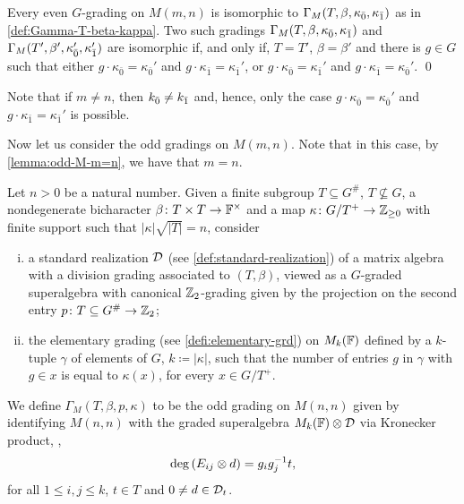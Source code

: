 \begin{cor}\label{cor:iso-M-even}
    Every even $G$-grading on $M(m,n)$ is isomorphic to $\Gamma_M (T, \beta, \kappa_{\bar{0}}, \kappa_{\bar{1}})$ as in \cref{def:Gamma-T-beta-kappa}. 
    Two such gradings $\Gamma_M (T, \beta, \kappa_{\bar{0}}, \kappa_{\bar{1}})$ and $\Gamma_M (T', \beta', \kappa_{\bar{0}}', \kappa_{\bar{1}}')$ are isomorphic if, and only if, $T = T'$, $\beta = \beta'$ and there is $g\in G$ such that either $g \cdot \kappa_{\bar 0}=\kappa_{\bar 0}'$ and $g \cdot \kappa_{\bar 1}=\kappa_{\bar 1}'$, or $g \cdot \kappa_{\bar 0}=\kappa_{\bar 1}'$ and $g \cdot \kappa_{\bar 1}=\kappa_{\bar 0}'$.  \qed
\end{cor}

Note that if $m \neq n$, 
then $k_{\bar{0}} \neq k_{\bar{1}}$ and, hence, only the case $g \cdot \kappa_{\bar 0}=\kappa_{\bar 0}'$ and $g \cdot \kappa_{\bar 1}=\kappa_{\bar 1}'$ is possible.


Now let us consider the odd gradings on $M(m,n)$. 
Note that in this case, by \cref{lemma:odd-M-m=n}, we have that $m = n$. 


\begin{defi}\label{def:Gamma-T-beta-kappa-odd}
    Let $n > 0$ be a natural number. 
    Given a finite subgroup $T \subseteq G^\#$, $T\not\subseteq G$, a nondegenerate bicharacter $\beta\colon T\times T \to \mathbb{F}^\times$ and a map $\kappa\colon G/T^+ \to \mathbb{Z}_{\geq 0}$ with finite support such that $|\kappa| \sqrt{|T|} = n$, consider 
    \begin{enumerate}[(i)]
        \item a standard realization $\mathcal{D}$ (see \cref{def:standard-realization}) of a matrix algebra with a division grading associated to $(T,\beta)$, viewed as a $G$-graded superalgebra with canonical $\mathbb{Z}_2$-grading given by the projection on the second entry $p\colon T \subseteq G^\# \to \mathbb{Z}_2$;
        \item the elementary grading (see \cref{defi:elementary-grd}) on $M_{k}(\mathbb{F})$ defined by a $k$-tuple $\gamma$ 
        of elements of $G$, $k \coloneqq |\kappa|$, such that the number of entries $g$ in $\gamma$ with $g\in x$ is equal to $\kappa (x)$, for every $x\in G/T^+$. 
    \end{enumerate}
    We define $\Gamma_M (T, \beta, p, \kappa)$ to be the odd grading on $M(n,n)$ given by identifying $M(n,n)$ with the graded superalgebra $M_k(\mathbb{F}) \otimes \mathcal{D}$ via Kronecker product, \ie,
    \[
        \deg \left( E_{ij} \otimes d \right) = g_ig_j^{-1} t,
    \] 
    for all $1\leq i, j \leq k$, $t\in T$ and $0 \neq d \in \mathcal{D}_t$.
\end{defi}

